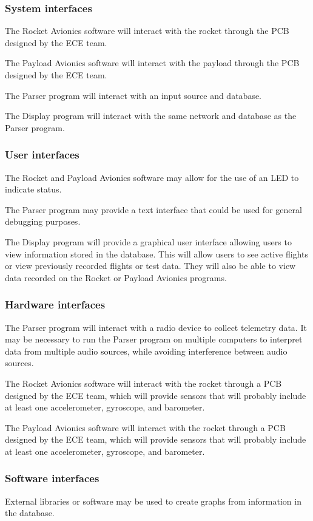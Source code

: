\documentclass[onecolumn, draftclsnofoot, 10pt, compsoc]{IEEEtran}
\begin{document}
\subsubsection{System interfaces}
The Rocket Avionics software will interact with the rocket through the PCB designed by the ECE team.

The Payload Avionics software will interact with the payload through the PCB designed by the ECE team.

The Parser program will interact with an input source and database.

The Display program will interact with the same network and database as the Parser program.

\subsubsection{User interfaces}
The Rocket and Payload Avionics software may allow for the use of an LED to indicate status.

The Parser program may provide a text interface that could be used for general debugging purposes.

The Display program will provide a graphical user interface allowing users to view information stored in the database. This will allow users to see active flights or view previously recorded flights or test data.  They will also be able to view data recorded on the Rocket or Payload Avionics programs.

\subsubsection{Hardware interfaces}
The Parser program will interact with a radio device to collect telemetry data.  It may be necessary to run the Parser program on multiple computers to interpret data from multiple audio sources, while avoiding interference between audio sources.

The Rocket Avionics software will interact with the rocket through a PCB designed by the ECE team, which will provide sensors that will probably include at least one accelerometer, gyroscope, and barometer.

The Payload Avionics software will interact with the rocket through a PCB designed by the ECE team, which will provide sensors that will probably include at least one accelerometer, gyroscope, and barometer. 

\subsubsection{Software interfaces}
External libraries or software may be used to create graphs from information in the database.
\end{document}
